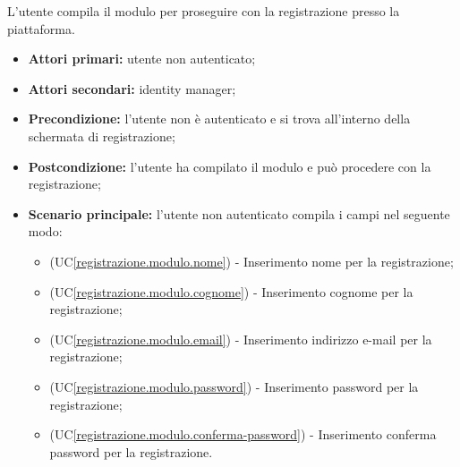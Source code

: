 \label{registrazione.modulo}
L'utente compila il modulo per proseguire con la registrazione presso la piattaforma.
\begin{itemize}
	\item \textbf{Attori primari:} utente non autenticato;
	\item \textbf{Attori secondari:} identity manager;
	\item \textbf{Precondizione:} l'utente non è autenticato e si trova all'interno della schermata di registrazione;
	\item \textbf{Postcondizione:} l'utente ha compilato il modulo e può procedere con la registrazione;
	\item \textbf{Scenario principale:} l'utente non autenticato compila i campi nel seguente modo:
	\begin{itemize}
		\item (UC\ref{registrazione.modulo.nome}) - Inserimento nome per la registrazione;
		\item (UC\ref{registrazione.modulo.cognome}) - Inserimento cognome per la registrazione;
		\item (UC\ref{registrazione.modulo.email}) - Inserimento indirizzo e-mail per la registrazione;
		\item (UC\ref{registrazione.modulo.password}) - Inserimento password per la registrazione;
		\item (UC\ref{registrazione.modulo.conferma-password}) - Inserimento conferma password per la registrazione.
	\end{itemize}
\end{itemize}

\label{registrazione.modulo.nome}

